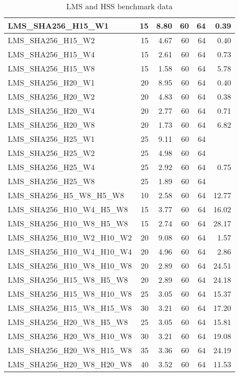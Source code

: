 \documentclass{article}
\begin{document}
\begin{table}[tbp]
\begin{tabular}{|l|r|r|r|r|r|}
        LMS\_SHA256\_H15\_W1 & 15 & 8.80 & 60 & 64 & 0.39 \\ \hline
        LMS\_SHA256\_H15\_W2 & 15 & 4.67 & 60 & 64 & 0.40 \\ \hline
        LMS\_SHA256\_H15\_W4 & 15 & 2.61 & 60 & 64 & 0.73 \\ \hline
        LMS\_SHA256\_H15\_W8 & 15 & 1.58 & 60 & 64 & 5.78 \\ \hline
        LMS\_SHA256\_H20\_W1 & 20 & 8.95 & 60 & 64 & 0.40 \\ \hline
        LMS\_SHA256\_H20\_W2 & 20 & 4.83 & 60 & 64 & 0.38 \\ \hline
        LMS\_SHA256\_H20\_W4 & 20 & 2.77 & 60 & 64 & 0.71 \\ \hline
        LMS\_SHA256\_H20\_W8 & 20 & 1.73 & 60 & 64 & 6.82 \\ \hline
        LMS\_SHA256\_H25\_W1 & 25 & 9.11 & 60 & 64 & ~ \\ \hline
        LMS\_SHA256\_H25\_W2 & 25 & 4.98 & 60 & 64 & ~ \\ \hline
        LMS\_SHA256\_H25\_W4 & 25 & 2.92 & 60 & 64 & 0.75 \\ \hline
        LMS\_SHA256\_H25\_W8 & 25 & 1.89 & 60 & 64 & ~ \\ \hline
        LMS\_SHA256\_H5\_W8\_H5\_W8 & 10 & 2.58 & 60 & 64 & 12.77 \\ \hline
        LMS\_SHA256\_H10\_W4\_H5\_W8 & 15 & 3.77 & 60 & 64 & 16.02 \\ \hline
        LMS\_SHA256\_H10\_W8\_H5\_W8 & 15 & 2.74 & 60 & 64 & 28.17 \\ \hline
        LMS\_SHA256\_H10\_W2\_H10\_W2 & 20 & 9.08 & 60 & 64 & 1.57 \\ \hline
        LMS\_SHA256\_H10\_W4\_H10\_W4 & 20 & 4.96 & 60 & 64 & 2.86 \\ \hline
        LMS\_SHA256\_H10\_W8\_H10\_W8 & 20 & 2.89 & 60 & 64 & 24.51 \\ \hline
        LMS\_SHA256\_H15\_W8\_H5\_W8 & 20 & 2.89 & 60 & 64 & 24.18 \\ \hline
        LMS\_SHA256\_H15\_W8\_H10\_W8 & 25 & 3.05 & 60 & 64 & 15.37 \\ \hline
        LMS\_SHA256\_H15\_W8\_H15\_W8 & 30 & 3.21 & 60 & 64 & 17.20 \\ \hline
        LMS\_SHA256\_H20\_W8\_H5\_W8 & 25 & 3.05 & 60 & 64 & 15.81 \\ \hline
        LMS\_SHA256\_H20\_W8\_H10\_W8 & 30 & 3.21 & 60 & 64 & 19.08 \\ \hline
        LMS\_SHA256\_H20\_W8\_H15\_W8 & 35 & 3.36 & 60 & 64 & 24.19 \\ \hline
        LMS\_SHA256\_H20\_W8\_H20\_W8 & 40 & 3.52 & 60 & 64 & 11.53 \\ \hline
    \end{tabular}
    \caption{LMS and HSS benchmark data}
    \label{tab:LMS_behcnmarks}
\end{table}
\restoregeometry
\end{document}
